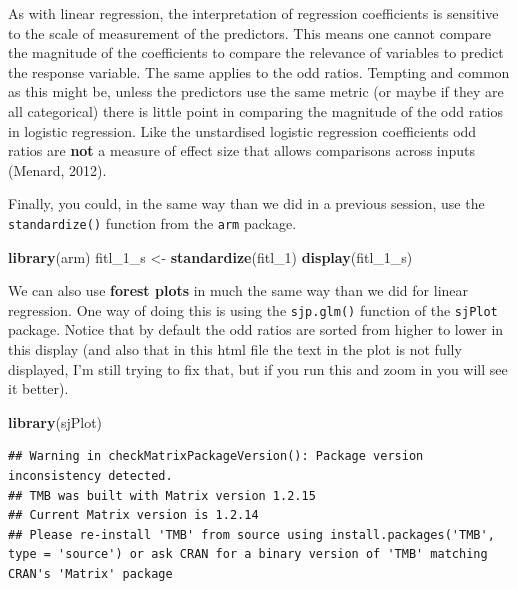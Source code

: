 \documentclass[]{book}
\newenvironment{Shaded}{\begin{snugshade}}{\end{snugshade}}
\newcommand{\DecValTok}[1]{\textcolor[rgb]{0.00,0.00,0.81}{#1}}
\newcommand{\KeywordTok}[1]{\textcolor[rgb]{0.13,0.29,0.53}{\textbf{#1}}}
\newcommand{\NormalTok}[1]{#1}
\newcommand{\StringTok}[1]{\textcolor[rgb]{0.31,0.60,0.02}{#1}}
\theoremstyle{definition}
\theoremstyle{definition}
\theoremstyle{definition}
\theoremstyle{remark}
\begin{document}
As with linear regression, the interpretation of regression coefficients
is sensitive to the scale of measurement of the predictors. This means
one cannot compare the magnitude of the coefficients to compare the
relevance of variables to predict the response variable. The same
applies to the odd ratios. Tempting and common as this might be, unless
the predictors use the same metric (or maybe if they are all
categorical) there is little point in comparing the magnitude of the odd
ratios in logistic regression. Like the unstardised logistic regression
coefficients odd ratios are \textbf{not} a measure of effect size that
allows comparisons across inputs (Menard, 2012).

Finally, you could, in the same way than we did in a previous session,
use the \texttt{standardize()} function from the \texttt{arm} package.

\begin{Shaded}
\begin{Highlighting}[]
\KeywordTok{library}\NormalTok{(arm)}
\NormalTok{fitl_}\DecValTok{1}\NormalTok{_s <-}\StringTok{ }\KeywordTok{standardize}\NormalTok{(fitl_}\DecValTok{1}\NormalTok{)}
\KeywordTok{display}\NormalTok{(fitl_}\DecValTok{1}\NormalTok{_s)}
\end{Highlighting}
\end{Shaded}

We can also use \textbf{forest plots} in much the same way than we did
for linear regression. One way of doing this is using the
\texttt{sjp.glm()} function of the \texttt{sjPlot} package. Notice that
by default the odd ratios are sorted from higher to lower in this
display (and also that in this html file the text in the plot is not
fully displayed, I'm still trying to fix that, but if you run this and
zoom in you will see it better).

\begin{Shaded}
\begin{Highlighting}[]
\KeywordTok{library}\NormalTok{(sjPlot)}
\end{Highlighting}
\end{Shaded}

\begin{verbatim}
## Warning in checkMatrixPackageVersion(): Package version inconsistency detected.
## TMB was built with Matrix version 1.2.15
## Current Matrix version is 1.2.14
## Please re-install 'TMB' from source using install.packages('TMB', type = 'source') or ask CRAN for a binary version of 'TMB' matching CRAN's 'Matrix' package
\end{verbatim}
\end{document}
